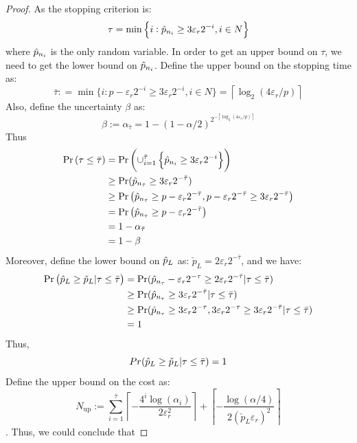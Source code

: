 \documentclass{iitthesis}
\begin{document}
\begin{proof}
As the stopping criterion is: $$\tau = \min\left\{i: \hat{p}_{n_i}\geq 3\varepsilon_r 2^{-i}, i \in N\right \}$$
where $\hat{p}_{n_i}$ is the only random variable. In order to get an upper bound on $\tau$, we need to get the lower bound on $\hat{p}_{n_i}$.
Define the upper bound on the stopping time as:
$$\bar{\tau}: = \min \{i:  p-\varepsilon_r2^{-i} \geq 3\varepsilon_r 2^{-i}, i \in N\} =\left \lceil \log_2 (4\varepsilon_r/p)\right \rceil$$
Also, define the uncertainty $\beta$ as:
$$\beta := \alpha_{\bar{\tau}}=1-(1-\alpha/2)^{2^{-\left \lceil \log_2 (4\varepsilon_r/p)\right \rceil}}$$
Thus 
\begin{align}
\Pr\left (\tau \leq \bar{\tau}\right) &= \Pr \left (\cup_{i=1}^{\bar{\tau}}\left \{\hat{p}_{n_i}\geq 3\varepsilon_r 2^{-i} \right \} \right) \\&
\geq \Pr( \hat{p}_{n_{\bar{\tau}}} \geq 3\varepsilon_r 2^{-\bar{\tau}}) \\&
\geq  \Pr \left( \hat{p}_{n_{\bar{\tau}}} \geq p-\varepsilon_r 2^{-\bar{\tau}} , p-\varepsilon_r 2^{-\bar{\tau}}  \geq 3 \varepsilon_r 2^{-\bar{\tau}}\right)\\&
= \Pr \left( \hat{p}_{n_{\bar{\tau}}} \geq p-\varepsilon_r 2^{-\bar{\tau}}\right) \\& =1-\alpha_{\bar{\tau}} \\& = 1-\beta
\end{align}
Moreover, define the lower bound on $\hat{p}_L$ as: $\check{p}_L = 2\varepsilon_r2^{-\bar{\tau}}$, and we have:
\begin{align}
\Pr\left(\hat{p}_L  \geq  \check{p}_L  | \tau \leq \bar{\tau}\right)& = \Pr(\hat{p}_{n_\tau} - \varepsilon_r 2^{-\tau}\geq 2\varepsilon_r2^{-\bar{\tau}}| \tau \leq \bar{\tau})\\&\geq \Pr(\hat{p}_{n_{\tau}}\geq 3\varepsilon_r2^{-{\bar{\tau}}}| \tau \leq \bar{\tau}) \\& \geq 
\Pr(\hat{p}_{n_{\tau}}\geq 3\varepsilon_r2^{-{\tau}}, 3\varepsilon_r2^{-{\tau}} \geq 3\varepsilon_r2^{-{\bar{\tau}}} | \tau \leq \bar{\tau})\\&
=1
\end{align}
Thus, $$Pr(\hat{p}_L \geq \check{p}_L | \tau \leq \bar{\tau})=1$$
Define the upper bound on the cost as:  
$$N_{\text{up}}:= \sum_{i=1}^{\bar{\tau}} \left \lceil -\frac{4^i \log(\alpha_i)} {2\varepsilon_r^2 } \right\rceil+\left \lceil -\frac{\log (\alpha/4)}{2  (\check{p}_L \varepsilon_{r})^2} \right \rceil$$. Thus, we could conclude that

\end{proof}
\end{document}
